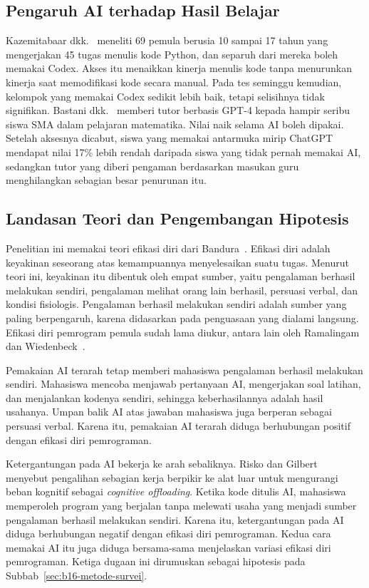 \subsection{Pengaruh AI terhadap Hasil Belajar}

Kazemitabaar dkk.~\cite{kazemitabaar2023} meneliti 69 pemula berusia 10 sampai 17 tahun yang mengerjakan 45 tugas menulis kode Python, dan separuh dari mereka boleh memakai Codex. Akses itu menaikkan kinerja menulis kode tanpa menurunkan kinerja saat memodifikasi kode secara manual. Pada tes seminggu kemudian, kelompok yang memakai Codex sedikit lebih baik, tetapi selisihnya tidak signifikan. Bastani dkk.~\cite{bastani2025} memberi tutor berbasis GPT-4 kepada hampir seribu siswa SMA dalam pelajaran matematika. Nilai naik selama AI boleh dipakai. Setelah aksesnya dicabut, siswa yang memakai antarmuka mirip ChatGPT mendapat nilai 17\% lebih rendah daripada siswa yang tidak pernah memakai AI, sedangkan tutor yang diberi pengaman berdasarkan masukan guru menghilangkan sebagian besar penurunan itu.

\subsection{Landasan Teori dan Pengembangan Hipotesis}
\label{sec:b16-teori}

Penelitian ini memakai teori efikasi diri dari Bandura~\cite{bandura1977}. Efikasi diri adalah keyakinan seseorang atas kemampuannya menyelesaikan suatu tugas. Menurut teori ini, keyakinan itu dibentuk oleh empat sumber, yaitu pengalaman berhasil melakukan sendiri, pengalaman melihat orang lain berhasil, persuasi verbal, dan kondisi fisiologis. Pengalaman berhasil melakukan sendiri adalah sumber yang paling berpengaruh, karena didasarkan pada penguasaan yang dialami langsung. Efikasi diri pemrogram pemula sudah lama diukur, antara lain oleh Ramalingam dan Wiedenbeck~\cite{ramalingam1998}.

Pemakaian AI terarah tetap memberi mahasiswa pengalaman berhasil melakukan sendiri. Mahasiswa mencoba menjawab pertanyaan AI, mengerjakan soal latihan, dan menjalankan kodenya sendiri, sehingga keberhasilannya adalah hasil usahanya. Umpan balik AI atas jawaban mahasiswa juga berperan sebagai persuasi verbal. Karena itu, pemakaian AI terarah diduga berhubungan positif dengan efikasi diri pemrograman.

Ketergantungan pada AI bekerja ke arah sebaliknya. Risko dan Gilbert~\cite{risko2016} menyebut pengalihan sebagian kerja berpikir ke alat luar untuk mengurangi beban kognitif sebagai \textit{cognitive offloading}. Ketika kode ditulis AI, mahasiswa memperoleh program yang berjalan tanpa melewati usaha yang menjadi sumber pengalaman berhasil melakukan sendiri. Karena itu, ketergantungan pada AI diduga berhubungan negatif dengan efikasi diri pemrograman. Kedua cara memakai AI itu juga diduga bersama-sama menjelaskan variasi efikasi diri pemrograman. Ketiga dugaan ini dirumuskan sebagai hipotesis pada Subbab~\ref{sec:b16-metode-survei}.

